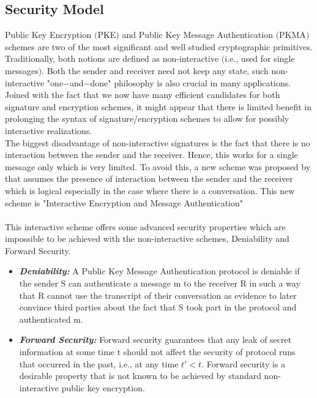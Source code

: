 \documentclass[main.tex]{subfiles}
\begin{document}
\normalsize
\begin{center}\section{Security Model}\end{center}

Public Key Encryption $($PKE$)$ and Public Key Message Authentication $($PKMA$)$ schemes are two of the most significant and well studied cryptographic primitives. Traditionally, both notions are defined as non-interactive $($i.e., used for single messages$)$. Both the sender and receiver need not keep any state, such non-interactive "one$-$and$-$done" philosophy is also crucial in many applications. Joined with the fact that we now have many efficient candidates for both signature and encryption schemes, it might appear that there is limited benefit in prolonging the syntax of signature/encryption schemes to allow for possibly interactive realizations.\\
The biggest disadvantage of non-interactive signatures is the fact that there is no interaction between the sender and the receiver. Hence, this works for a single message only which is very limited. To avoid this, a new scheme was proposed by \cite{dodis2014interactive} that assumes the presence of interaction between the sender and the receiver which is logical especially in the case where there is a conversation. This new scheme is "Interactive Encryption and Message Authentication" \cite{dodis2014interactive} \paragraph{} This interactive scheme offers some advanced security properties which are impossible to be achieved with the non-interactive schemes, Deniability and Forward Security.\begin{itemize}
\item \textbf{\textit{Deniability:}} A Public Key Message Authentication protocol is deniable if the sender S can authenticate a message m to the receiver R in such a way that R cannot use the transcript of their conversation as evidence to later convince third parties about the fact that S took part in the protocol and authenticated m.
\item \textbf{\textit{Forward Security:}} Forward security guarantees that any leak of secret information at some time t should not affect the security of protocol runs that occurred in the past, i.e., at any time $t' < t$. Forward security is a desirable property that is not known to be achieved by standard non-interactive public key encryption.
\end{itemize}
\end{document}
